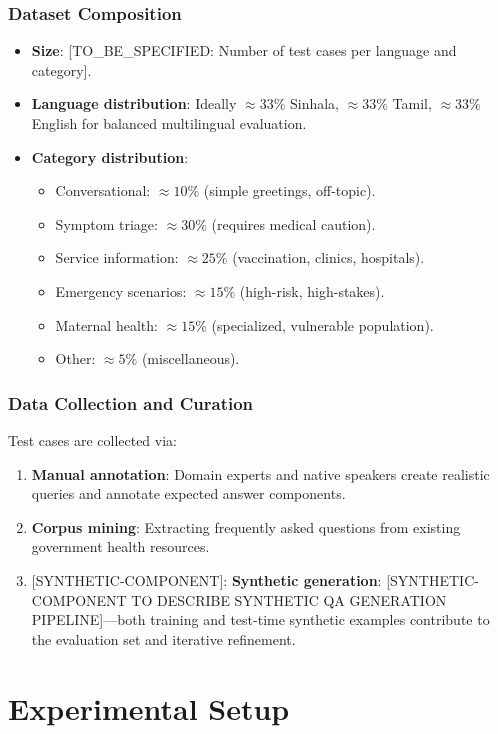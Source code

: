 \documentclass[11pt,a4paper]{article}
\newcommand{\synthetic}[1]{{\colorbox{syntheticcolor}{[SYNTHETIC-COMPONENT]: #1}}}
\begin{document}
\subsubsection{Dataset Composition}
\begin{itemize}
    \item \textbf{Size}: [TO\_BE\_SPECIFIED: Number of test cases per language and category].
    \item \textbf{Language distribution}: Ideally $\approx 33\%$ Sinhala, $\approx 33\%$ Tamil, $\approx 33\%$ English for balanced multilingual evaluation.
    \item \textbf{Category distribution}: 
    \begin{itemize}
        \item Conversational: $\approx 10\%$ (simple greetings, off-topic).
        \item Symptom triage: $\approx 30\%$ (requires medical caution).
        \item Service information: $\approx 25\%$ (vaccination, clinics, hospitals).
        \item Emergency scenarios: $\approx 15\%$ (high-risk, high-stakes).
        \item Maternal health: $\approx 15\%$ (specialized, vulnerable population).
        \item Other: $\approx 5\%$ (miscellaneous).
    \end{itemize}
\end{itemize}

\subsubsection{Data Collection and Curation}
Test cases are collected via:
\begin{enumerate}
    \item \textbf{Manual annotation}: Domain experts and native speakers create realistic queries and annotate expected answer components.
    \item \textbf{Corpus mining}: Extracting frequently asked questions from existing government health resources.
    \item \synthetic{
        \textbf{Synthetic generation}: [SYNTHETIC-COMPONENT TO DESCRIBE SYNTHETIC QA GENERATION PIPELINE]---both training and test-time synthetic examples contribute to the evaluation set and iterative refinement.
    }
\end{enumerate}

\section{Experimental Setup}
\end{document}
